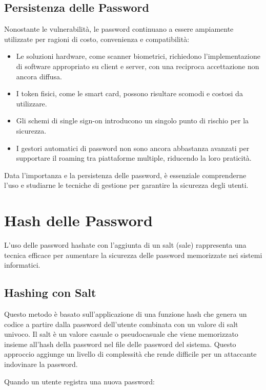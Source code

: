 \subsection{Persistenza delle Password}

Nonostante le vulnerabilità, le password continuano a essere ampiamente utilizzate per ragioni di costo, convenienza e compatibilità:

\begin{itemize}
    \item Le soluzioni hardware, come scanner biometrici, richiedono l'implementazione di software appropriato su client e server, con una reciproca accettazione non ancora diffusa.
    \item I token fisici, come le smart card, possono risultare scomodi e costosi da utilizzare.
    \item Gli schemi di single sign-on introducono un singolo punto di rischio per la sicurezza.
    \item I gestori automatici di password non sono ancora abbastanza avanzati per supportare il roaming tra piattaforme multiple, riducendo la loro praticità.
\end{itemize}

Data l'importanza e la persistenza delle password, è essenziale comprenderne l'uso e studiarne le tecniche di gestione per garantire la sicurezza degli utenti.

\section{Hash delle Password}

L'uso delle password hashate con l'aggiunta di un salt (sale) rappresenta una tecnica efficace per aumentare la sicurezza delle password memorizzate nei sistemi informatici.

\subsection{Hashing con Salt}

Questo metodo è basato sull'applicazione di una funzione hash che genera un codice a partire dalla password dell'utente combinata con un valore di salt univoco. Il salt è un valore casuale o pseudocasuale che viene memorizzato insieme all'hash della password nel file delle password del sistema. Questo approccio aggiunge un livello di complessità che rende difficile per un attaccante indovinare la password.

Quando un utente registra una nuova password:

